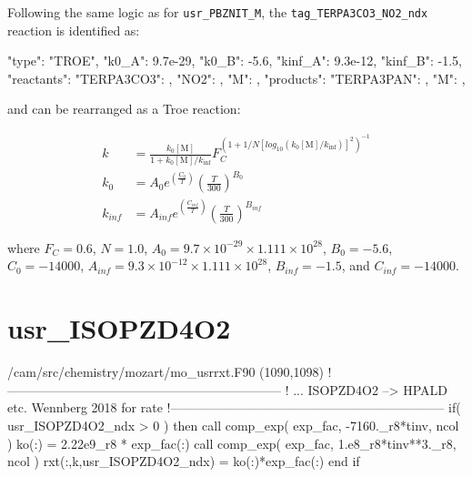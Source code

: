 \documentclass[titlepage]{article}
\begin{document}
Following the same logic as for \verb>usr_PBZNIT_M>, the \verb>tag_TERPA3CO3_NO2_ndx> reaction is identified as:

\begin{blockcode}
        {
          "type": "TROE",
          "k0_A": 9.7e-29,
          "k0_B": -5.6,
          "kinf_A": 9.3e-12,
          "kinf_B": -1.5,
          "reactants": {
            "TERPA3CO3": { },
            "NO2": { },
            "M": { }
          },
          "products": {
            "TERPA3PAN": { },
            "M": { }
          }
        },
\end{blockcode}

\noindent and can be rearranged as a Troe reaction:

\begin{equation}
\begin{split}
k & = \frac{k_0[\mbox{M}]}{1+k_0[\mbox{M}]/k_{\inf}}F_C^{(1+1/N[log_{10}(k_0[\mbox{M}]/k_{\inf})]^2)^{-1}} \\
k_0 & = A_0 e^{\left( \frac{C_0}{T} \right)} \left( \frac{T}{300} \right)^{B_0} \\
k_{inf} & = A_{inf} e^{\left( \frac{C_{inf}}{T} \right)} \left( \frac{T}{300} \right)^{B_{inf}}
\end{split}
\end{equation}

\noindent where $F_C = 0.6$, $N = 1.0$, $A_0 = 9.7 \times 10^{-29} \times 1.111 \times 10^{28}$, $B_0 = -5.6$, $C_0 = -14000$, $A_{inf} = 9.3 \times 10^{-12} \times 1.111 \times 10^{28}$, $B_{inf} = -1.5$, and $C_{inf} = -14000$.


\section{usr\_ISOPZD4O2}

\begin{blockcode}[commandchars=\\\{\}]
\color{gray}/cam/src/chemistry/mozart/mo_usrrxt.F90 (1090,1098)
!-----------------------------------------------------------------
!       ... ISOPZD4O2 --> HPALD etc. Wennberg 2018 for rate
!-----------------------------------------------------------------
       if( usr_ISOPZD4O2_ndx > 0 ) then
          call comp_exp( exp_fac, -7160._r8*tinv, ncol )
          ko(:) = 2.22e9_r8 * exp_fac(:)
          call comp_exp( exp_fac, 1.e8_r8*tinv**3._r8, ncol )
          rxt(:,k,usr_ISOPZD4O2_ndx) = ko(:)*exp_fac(:)
       end if
\end{blockcode}
\end{document}
